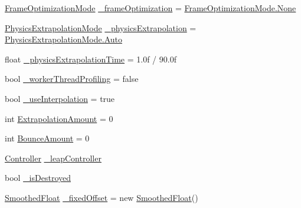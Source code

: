 \begin{DoxyCompactItemize}
\mbox{\hyperlink{class_leap_1_1_unity_1_1_leap_service_provider_aded29faa9adf0b09e63a1659e5b0f82d}{Frame\+Optimization\+Mode}} \mbox{\hyperlink{class_leap_1_1_unity_1_1_leap_service_provider_a58ab122b5e6430d5fb98fccf7e600e54}{\+\_\+frame\+Optimization}} = \mbox{\hyperlink{class_leap_1_1_unity_1_1_leap_service_provider_aded29faa9adf0b09e63a1659e5b0f82da6adf97f83acf6453d4a6a4b1070f3754}{Frame\+Optimization\+Mode.\+None}}
\item 
\mbox{\hyperlink{class_leap_1_1_unity_1_1_leap_service_provider_a2ce142abf998f86ac23b3d30032ea82e}{Physics\+Extrapolation\+Mode}} \mbox{\hyperlink{class_leap_1_1_unity_1_1_leap_service_provider_ad27fe97e7347f34807b34374b0cea29c}{\+\_\+physics\+Extrapolation}} = \mbox{\hyperlink{class_leap_1_1_unity_1_1_leap_service_provider_a2ce142abf998f86ac23b3d30032ea82ea06b9281e396db002010bde1de57262eb}{Physics\+Extrapolation\+Mode.\+Auto}}
\item 
float \mbox{\hyperlink{class_leap_1_1_unity_1_1_leap_service_provider_a5233916e10a6d00759deab7e5d4151a0}{\+\_\+physics\+Extrapolation\+Time}} = 1.\+0f / 90.\+0f
\item 
bool \mbox{\hyperlink{class_leap_1_1_unity_1_1_leap_service_provider_a509baa1d3527f6417e9861925d2bd447}{\+\_\+worker\+Thread\+Profiling}} = false
\item 
bool \mbox{\hyperlink{class_leap_1_1_unity_1_1_leap_service_provider_a9d65f610510fdc7bb299d5f9b6bbdd29}{\+\_\+use\+Interpolation}} = true
\item 
int \mbox{\hyperlink{class_leap_1_1_unity_1_1_leap_service_provider_ab8edf176edaa9cddcc300f170f61c55e}{Extrapolation\+Amount}} = 0
\item 
int \mbox{\hyperlink{class_leap_1_1_unity_1_1_leap_service_provider_a7ce59365ab427558123780fa15ca50fd}{Bounce\+Amount}} = 0
\item 
\mbox{\hyperlink{class_leap_1_1_controller}{Controller}} \mbox{\hyperlink{class_leap_1_1_unity_1_1_leap_service_provider_a81109a7f1bd8d6fb195fb31e5c85fad3}{\+\_\+leap\+Controller}}
\item 
bool \mbox{\hyperlink{class_leap_1_1_unity_1_1_leap_service_provider_a8e1a44556c88725caaaafa35e0991d78}{\+\_\+is\+Destroyed}}
\item 
\mbox{\hyperlink{class_leap_1_1_unity_1_1_smoothed_float}{Smoothed\+Float}} \mbox{\hyperlink{class_leap_1_1_unity_1_1_leap_service_provider_acc5d58cd24f2c8e6fdcfe3055b11c236}{\+\_\+fixed\+Offset}} = new \mbox{\hyperlink{class_leap_1_1_unity_1_1_smoothed_float}{Smoothed\+Float}}()
\item 

\end{DoxyCompactItemize}
